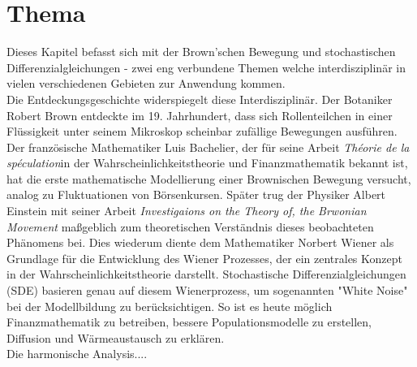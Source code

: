 %
%
%
%
\chapter{Thema\label{chapter:brown}}
\begin{refsection}


Dieses Kapitel befasst sich mit der Brown'schen Bewegung und stochastischen Differenzialgleichungen - zwei eng verbundene Themen welche interdisziplinär in vielen verschiedenen Gebieten zur Anwendung kommen.\\


Die Entdeckungsgeschichte widerspiegelt diese Interdisziplinär. Der Botaniker Robert Brown entdeckte im 19. Jahrhundert, dass sich Rollenteilchen in einer Flüssigkeit unter seinem Mikroskop scheinbar zufällige Bewegungen ausführen. Der französische Mathematiker Luis Bachelier, der für seine Arbeit \glqq \textit{Théorie de la spéculation}\glqq{}in der Wahrscheinlichkeitstheorie und Finanzmathematik bekannt ist, hat die erste mathematische Modellierung einer Brownischen Bewegung versucht, analog zu Fluktuationen von Börsenkursen. Später trug der Physiker Albert Einstein mit seiner Arbeit \glqq \textit{Investigaions on the Theory of, the Brwonian Movement}\glqq{} maßgeblich zum theoretischen Verständnis dieses beobachteten Phänomens bei. Dies wiederum diente dem Mathematiker Norbert Wiener als Grundlage für die Entwicklung des Wiener Prozesses, der ein zentrales Konzept in der Wahrscheinlichkeitstheorie darstellt. Stochastische Differenzialgleichungen (SDE) basieren genau auf diesem Wienerprozess, um sogenannten "White Noise" bei der Modellbildung zu berücksichtigen. So ist es heute möglich Finanzmathematik zu betreiben, bessere Populationsmodelle zu erstellen, Diffusion und Wärmeaustausch zu erklären.\\


Die harmonische Analysis....







\printbibliography[heading=subbibliography]
\end{refsection}
